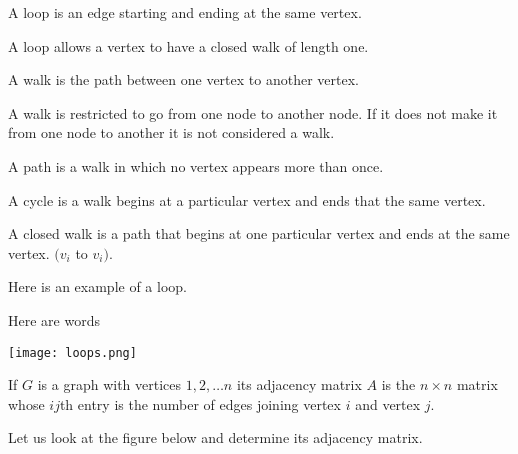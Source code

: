 \begin{definition}[Loop]
    A loop is an edge starting and ending at the same vertex.  
\end{definition}

A loop allows a vertex to have a closed walk of length one.

\begin{definition}[Walk]
    A walk is the path between one vertex to another vertex.  
\end{definition}

A walk is restricted to go from one node to another node.  If it does not make it from one node to another it is not considered a walk.
\begin{definition}[Path]
  A path is a walk in which no vertex appears more than once.  
\end{definition}

\begin{definition}[Cycle]
  A cycle is a walk begins at a particular vertex and ends that the same vertex.
\end{definition}
\begin{definition}
A closed walk is a path that begins at one particular vertex and ends at the same vertex. $(v_i$ to $v_i)$.
\end{definition}
Here is an example of a loop.
\begin{exmp}
Here are words
         \begin{center}
         \texttt{[image: loops.png]}
         \end{center}
\end{exmp}
 \begin{definition}
   If $G$ is a graph with vertices ${1,2,\dots n}$ its adjacency matrix $A$ is the $n \times n$ matrix whose $ij$th entry is the number of edges joining vertex $i$ and vertex $j$. 
 \end{definition}

 \begin{exmp}
   Let us look at the figure below and determine its adjacency matrix.
 \end{exmp}

